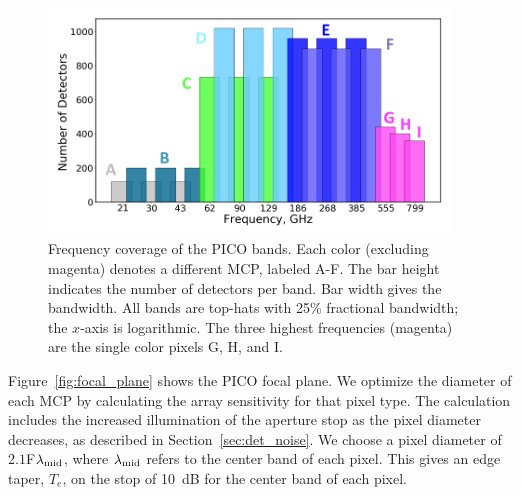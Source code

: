 \documentclass[]{spie}  %
\newcommand{\comb}[1]{\textcolor{blue}{#1}}
\begin{document}
\begin{figure} [ht]
\begin{center}
\includegraphics[height=6cm]{bands_label.png}
\end{center}
\caption { \label{fig:bands} 
Frequency coverage of the PICO bands. Each color (excluding magenta) denotes a different MCP, labeled A-F. The bar height 
indicates the number of detectors per band.  Bar width gives the bandwidth. All bands are top-hats with 
25\% fractional bandwidth; the $x$-axis is logarithmic.  The three highest frequencies (magenta) are the 
single color pixels G, H, and I.}
\end{figure} 

Figure~\ref{fig:focal_plane} shows the PICO focal plane.  
We optimize the diameter of each MCP by calculating the array sensitivity for that pixel type. The calculation includes the 
increased illumination of the aperture stop as the pixel diameter decreases, as described in Section~\ref{sec:det_noise}.
We choose a pixel diameter of $2.1$F$\lambda_{\rm mid}$, where $\lambda_{\rm mid}$ refers to the center 
band of each pixel. This gives an edge taper, $T_e$, on the stop of 10~dB for the center band of each pixel. 

\end{document}

